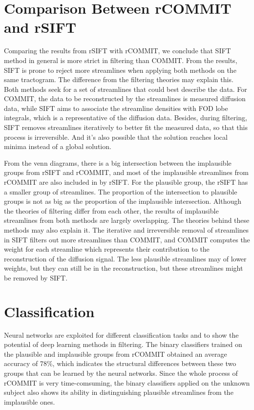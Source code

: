 \section{Comparison Between rCOMMIT and rSIFT}

Comparing the results from rSIFT with rCOMMIT, we conclude that SIFT method in general is more strict in filtering than COMMIT. From the results, SIFT 
is prone to reject more streamlines when applying both methods on the same tractogram.  
The difference from the filtering theories may explain this. 
Both methods seek for a set of streamlines that could best describe the data. For COMMIT, the data to be reconstructed by the streamlines is measured diffusion data, while 
SIFT aims to associate the streamline densities with FOD lobe integrals, which is a representative of the diffusion data. Besides,
during filtering, SIFT removes streamlines iteratively to better fit the measured data, so that this process is irreversible. And it's 
also possible that the solution reaches local minima instead of a global solution.


From the venn diagrams, there is a big intersection between the implausible groups from rSIFT and rCOMMIT, 
and most of the implausible streamlines from rCOMMIT are also included in by rSIFT. For the plausible 
group, the rSIFT has a smaller group of streamlines. The proportion of the intersection to plausible groups is not 
as big as the proportion of the implausible intersection. Although the theories of filtering differ from each other,
the results of implausible streamlines from both methods are largely overlapping. 
The theories behind these methods may also explain it. The iterative and irreversible removal of streamlines in SIFT filters out more streamlines than COMMIT,
and COMMIT computes the weight for each streamline which represents their contribution to the reconstruction of the diffusion signal. 
The less plausible streamlines may of lower weights, but they can still be in the reconstruction, but these streamlines might be removed by SIFT.


\section{Classification}

Neural networks are exploited for different classification tasks and to show the potential of deep learning methods in filtering.
The binary classifiers trained on the plausible and implausible groups from rCOMMIT obtained an average accuracy of 78\%, which indicates the 
structural differences between these two groups that can be learned by the neural networks. Since the whole process of rCOMMIT is very time-comsuming,
the binary classifiers applied on the unknown subject also shows its ability in distinguishing plausible streamlines from the implausible ones.

